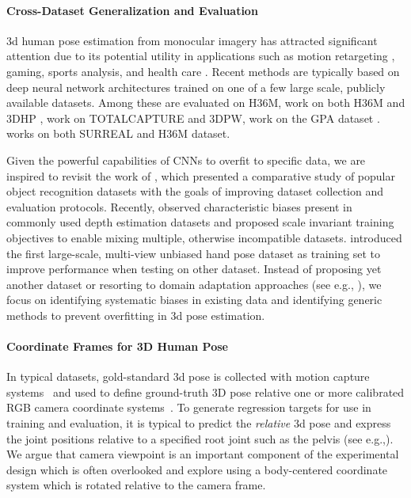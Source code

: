 \documentclass[runningheads]{llncs}
\begin{document}
\paragraph{Cross-Dataset Generalization and Evaluation}
3d human pose estimation from monocular imagery has attracted significant
attention due to its potential utility in applications such as motion
retargeting \cite{motionretarget}, gaming, sports analysis, and health care
\cite{austim}.  Recent methods are typically based on deep neural network
architectures \cite{simple,rootnet,volumetric,pavllo:quaternet:2018,integral,Zhou_2017_ICCV}
trained on one of a few large scale, publicly available datasets. Among these
are \cite{simple,volumetric,integral} evaluated on H36M,
\cite{mono_3dhp2017,Zhou_2017_ICCV} work on both H36M \cite{h36m_pami} and 3DHP
\cite{mono_3dhp2017}, \cite{inthewildeccv2018,Trumble:BMVC:2017} work on
TOTALCAPTURE \cite{Trumble:BMVC:2017} and 3DPW\cite{inthewildeccv2018},
\cite{gpa} work on the GPA dataset \cite{gpa}. \cite{varol17_surreal} works on
both SURREAL \cite{varol17_surreal} and H36M \cite{h36m_pami} dataset. 

Given the powerful capabilities of CNNs to overfit to specific data, we are
inspired to revisit the work of \cite{unbiaseddataset}, which presented a
comparative study of popular object recognition datasets with the goals of
improving dataset collection and evaluation protocols. Recently, 
\cite{generalize_depth} observed characteristic biases present in commonly used
depth estimation datasets and proposed scale invariant training objectives to
enable mixing multiple, otherwise incompatible datasets.
\cite{generalize_handpose} introduced the first large-scale, multi-view
unbiased  hand pose dataset as training set to improve performance when testing
on other dataset.  Instead of proposing yet another dataset or resorting to
domain adaptation approaches (see e.g., \cite{universaldetection}), we focus
on identifying systematic biases in existing data and identifying generic
methods to prevent overfitting in 3d pose estimation.







\paragraph{Coordinate Frames for 3D Human Pose}
In typical datasets, gold-standard 3d pose is collected with motion capture
systems~\cite{h36m_pami,humaneva,Trumble:BMVC:2017,gpa} and used to define
ground-truth 3D pose relative one or more calibrated RGB camera coordinate
systems~\cite{h36m_pami,inthewildeccv2018,mono_3dhp2017,varol17_surreal,gpa}.
To generate regression targets for use in training and evaluation, it is
typical to predict the {\em relative} 3d pose and express the joint positions
relative to a specified root joint such as the pelvis (see
e.g.,\cite{rootnet,integral}).  We argue that camera viewpoint is an important
component of the experimental design which is often overlooked and explore 
using a body-centered coordinate system which is rotated relative to the 
camera frame.
\end{document}
